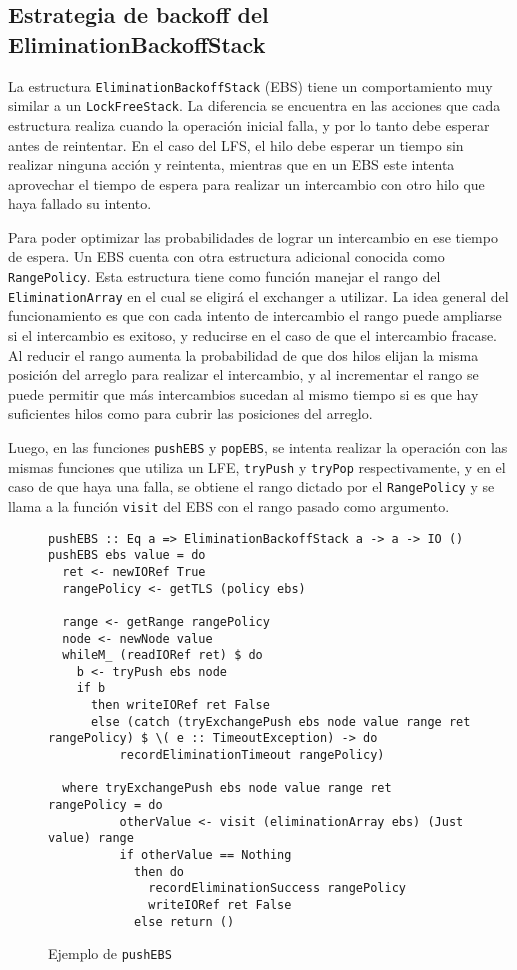 \subsection{Estrategia de backoff del EliminationBackoffStack}
La estructura \texttt{EliminationBackoffStack} (EBS) tiene un comportamiento muy similar a un \texttt{LockFreeStack}. La diferencia se encuentra en las acciones que cada estructura realiza cuando la operación inicial falla, y por lo tanto debe esperar antes de reintentar. En el caso del LFS, el hilo debe esperar un tiempo sin realizar ninguna acción y reintenta, mientras que en un EBS este intenta aprovechar el tiempo de espera para realizar un intercambio con otro hilo que haya fallado su intento.

Para poder optimizar las probabilidades de lograr un intercambio en ese tiempo de espera. Un EBS cuenta con otra estructura adicional conocida como \texttt{RangePolicy}. Esta estructura tiene como función manejar el rango del \texttt{EliminationArray} en el cual se eligirá el exchanger a utilizar.
La idea general del funcionamiento es que con cada intento de intercambio el rango puede ampliarse si el intercambio es exitoso, y reducirse en el caso de que el intercambio fracase.
Al reducir el rango aumenta la probabilidad de que dos hilos elijan la misma posición del arreglo para realizar el intercambio, y al incrementar el rango se puede permitir que más intercambios sucedan al mismo tiempo si es que hay suficientes hilos como para cubrir las posiciones del arreglo.

Luego, en las funciones \texttt{pushEBS} y \texttt{popEBS}, se intenta realizar la operación con las mismas funciones que utiliza un LFE, \texttt{tryPush} y \texttt{tryPop} respectivamente, y en el caso de que haya una falla, se obtiene el rango dictado por el \texttt{RangePolicy} y se llama a la función \texttt{visit} del EBS con el rango pasado como argumento.

\begin{figure}[H]
\begin{verbatim}
pushEBS :: Eq a => EliminationBackoffStack a -> a -> IO ()
pushEBS ebs value = do
  ret <- newIORef True
  rangePolicy <- getTLS (policy ebs)

  range <- getRange rangePolicy
  node <- newNode value
  whileM_ (readIORef ret) $ do
    b <- tryPush ebs node
    if b
      then writeIORef ret False
      else (catch (tryExchangePush ebs node value range ret rangePolicy) $ \( e :: TimeoutException) -> do
          recordEliminationTimeout rangePolicy)

  where tryExchangePush ebs node value range ret rangePolicy = do
          otherValue <- visit (eliminationArray ebs) (Just value) range
          if otherValue == Nothing
            then do
              recordEliminationSuccess rangePolicy
              writeIORef ret False
            else return ()
\end{verbatim}
\caption{Ejemplo de \texttt{pushEBS}}
\end{figure}

